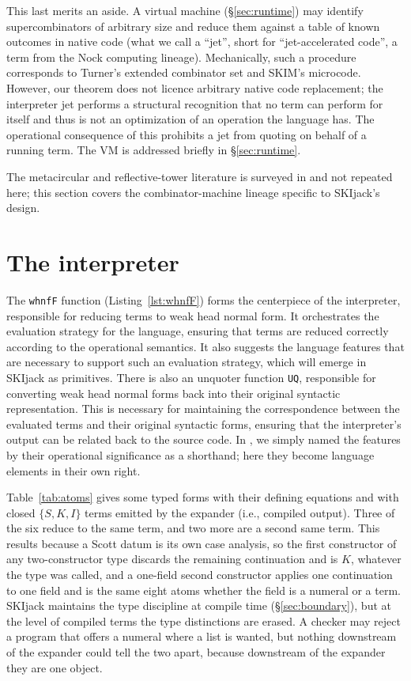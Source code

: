 \documentclass[english,submission,code=tt]{programming}
\begin{document}
This last merits an aside.  A virtual machine 
(\S\ref{sec:runtime}) may identify supercombinators of arbitrary size
and reduce them against a table of known outcomes in native code (what
we call a ``jet'', short for ``jet-accelerated code'', a term from the 
Nock computing lineage).  Mechanically, such a procedure
corresponds to Turner's extended combinator set and SKIM's microcode.  
However, our theorem does not licence arbitrary native code replacement;
the interpreter jet performs a structural recognition that no
term can perform for itself and thus is not an optimization of an
operation the language has.  The operational consequence of this
prohibits a jet from quoting on behalf of a running term.  The
VM is addressed briefly in \S\ref{sec:runtime}.

The metacircular and reflective-tower literature is surveyed in \citet{Davis2027} and not repeated here; this section covers the combinator-machine lineage specific to SKIjack's design.

\section{The interpreter}\label{sec:interpreter}

The \texttt{whnfF} function (Listing~\ref{lst:whnfF}) forms the centerpiece of the interpreter, 
responsible for reducing terms to weak head normal form.  It
orchestrates the evaluation strategy for the language, ensuring that 
terms are reduced correctly according to the operational semantics.
It also suggests the language features that are necessary to support 
such an evaluation strategy, which will emerge in SKIjack as primitives.
There is also an unquoter function \texttt{UQ}, responsible for 
converting weak head normal forms back into their original syntactic 
representation.  This is necessary for maintaining the correspondence 
between the evaluated terms and their original syntactic forms, ensuring 
that the interpreter's output can be related back to the source code.
In \citet{Davis2027}, we simply named the features by their operational
significance as a shorthand; here they become language elements in their
own right.

Table~\ref{tab:atoms} gives some typed forms with their defining 
equations and with closed $\{S,K,I\}$ terms emitted by the expander
(i.e., compiled output).  Three of the six reduce to
the same term, and two more are a second same term.  This results because
a Scott datum is its own case analysis, so the first constructor of any 
two-constructor type discards the remaining continuation and is $K$, 
whatever the type was called, and a one-field second constructor applies 
one continuation to one field and is the same eight atoms whether the 
field is a numeral or a term.  SKIjack maintains the type discipline at
compile time (\S\ref{sec:boundary}), but at the level of compiled terms 
the type distinctions are erased.  A checker may reject a program
that offers a numeral where a list is wanted, but nothing downstream of 
the expander could tell the two apart, because downstream of the 
expander they are one object.  %
\end{document}
